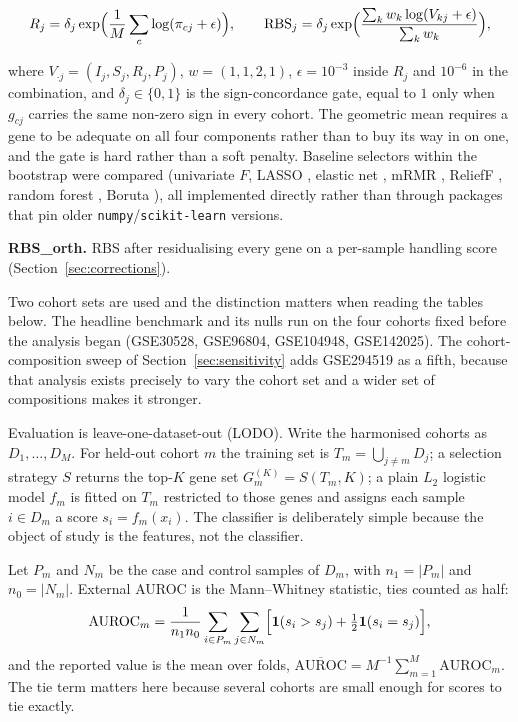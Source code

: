 \documentclass[pdflatex,sn-vancouver-num]{sn-jnl}
\theoremstyle{thmstyleone}
\theoremstyle{thmstyletwo}
\theoremstyle{thmstylethree}
\begin{document}
\begin{equation}
R_j = \delta_j \exp\Bigl( \frac{1}{M} \sum_{c} \log (\pi_{cj} + \epsilon) \Bigr) , \qquad
\mathrm{RBS}_j = \delta_j \exp\Bigl( \frac{\sum_k w_k \log (V_{kj} + \epsilon)}{\sum_k w_k} \Bigr) ,
\label{eq:rbs}
\end{equation}

where $V_{\cdot j} = (I_j, S_j, R_j, P_j)$, $w = (1, 1, 2, 1)$, $\epsilon = 10^{-3}$ inside $R_j$ and $10^{-6}$ in the combination, and $\delta_j \in \{0, 1\}$ is the
sign-concordance gate, equal to $1$ only when $g_{cj}$ carries the same non-zero sign in every
cohort. The geometric mean requires a gene to be adequate on all four components rather
than to buy its way in on one, and the gate is hard rather than a soft penalty. Baseline selectors within the bootstrap were compared (univariate
$F$, LASSO \cite{tibshirani1996}, elastic net \cite{zou2005}, mRMR \cite{peng2005}, ReliefF \cite{kononenko1994}, random forest \cite{breiman2001}, Boruta \cite{kursa2010}), all implemented directly rather
than through packages that pin older \texttt{numpy}/\texttt{scikit-learn} versions.

\textbf{RBS\_orth.} RBS after residualising every gene on a per-sample handling score
(Section~\ref{sec:corrections}).

Two cohort sets are used and the distinction matters when reading the tables below. The headline
benchmark and its nulls run on the four cohorts fixed before the analysis began (GSE30528,
GSE96804, GSE104948, GSE142025). The cohort-composition sweep of Section~\ref{sec:sensitivity}
adds GSE294519 as a fifth, because that analysis exists precisely to vary the cohort set and
a wider set of compositions makes it stronger.

Evaluation is leave-one-dataset-out (LODO). Write the harmonised cohorts as $D_1,\dots,D_M$. For held-out cohort $m$ the training set is $T_m = \bigcup_{j \neq m} D_j$; a selection strategy $S$ returns the top-$K$ gene set $G_m^{(K)} = S(T_m,K)$; a plain $L_2$ logistic model $f_m$ is fitted on $T_m$ restricted to those genes and assigns each sample $i \in D_m$ a score $s_i = f_m(x_i)$. The classifier is deliberately simple because the object of study is the features, not the classifier.

Let $P_m$ and $N_m$ be the case and control samples of $D_m$, with $n_1 = |P_m|$ and $n_0 = |N_m|$. External AUROC is the Mann--Whitney statistic, ties counted as half:
\begin{equation}
\mathrm{AUROC}_m = \frac{1}{n_1 n_0}
\sum_{i \in P_m} \sum_{j \in N_m}
\Bigl[ \mathbf{1}(s_i > s_j) + \tfrac{1}{2}\mathbf{1}(s_i = s_j) \Bigr] ,
\label{eq:auroc}
\end{equation}
and the reported value is the mean over folds, $\overline{\mathrm{AUROC}} = M^{-1}\sum_{m=1}^{M} \mathrm{AUROC}_m$. The tie term matters here because several cohorts are small enough for scores to tie exactly.
\end{document}
